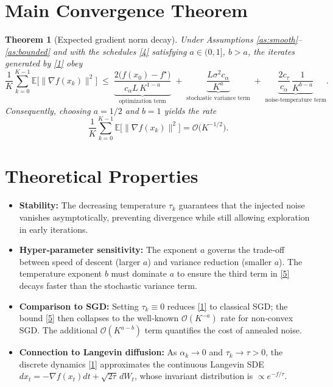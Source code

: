 \documentclass{article}
\newtheorem{theorem}{Theorem}
\newcommand{\EE}{\mathbb{E}}
\begin{document}
\section*{Main Convergence Theorem}
\begin{theorem}[Expected gradient norm decay]\label{thm:main}
Under Assumptions \ref{as:smooth}–\ref{as:bounded} and with the schedules \eqref{4} satisfying $a\in(0,1]$, $b>a$, the iterates generated by \eqref{1} obey
\[
\frac{1}{K}\sum_{k=0}^{K-1}\EE\!\bigl[\|\nabla f(x_{k})\|^{2}\bigr]
\;\le\;
\underbrace{\frac{2\bigl(f(x_{0})-f^{\star}\bigr)}{c_{\alpha}L\,K^{1-a}}}_{\text{optimization term}}
\;+\;
\underbrace{\frac{L\sigma^{2}c_{\alpha}}{K^{a}}}_{\text{stochastic variance term}}
\;+\;
\underbrace{\frac{2c_{\tau}}{c_{\alpha}}\,\frac{1}{K^{b-a}}}_{\text{noise‑temperature term}} .
\tag{5}
\]
Consequently, choosing $a=1/2$ and $b=1$ yields the rate
\[
\frac{1}{K}\sum_{k=0}^{K-1}\EE\!\bigl[\|\nabla f(x_{k})\|^{2}\bigr]=\mathcal O\!\bigl(K^{-1/2}\bigr).
\]
\end{theorem}

\section*{Theoretical Properties}
\begin{itemize}[noitemsep,topsep=0pt]
\item \textbf{Stability:} The decreasing temperature $\tau_{k}$ guarantees that the injected noise vanishes asymptotically, preventing divergence while still allowing exploration in early iterations.
\item \textbf{Hyper‑parameter sensitivity:} The exponent $a$ governs the trade‑off between speed of descent (larger $a$) and variance reduction (smaller $a$). The temperature exponent $b$ must dominate $a$ to ensure the third term in \eqref{5} decays faster than the stochastic variance term.
\item \textbf{Comparison to SGD:} Setting $\tau_{k}\equiv0$ reduces \eqref{1} to classical SGD; the bound \eqref{5} then collapses to the well‑known $\mathcal O(K^{-a})$ rate for non‑convex SGD. The additional $\mathcal O(K^{a-b})$ term quantifies the cost of annealed noise.
\item \textbf{Connection to Langevin diffusion:} As $\alpha_{k}\to0$ and $\tau_{k}\to\tau>0$, the discrete dynamics \eqref{1} approximates the continuous Langevin SDE $dx_{t}=-\nabla f(x_{t})dt+\sqrt{2\tau}\,dW_{t}$, whose invariant distribution is $\propto e^{-f/\tau}$.
\end{itemize}
\end{document}
